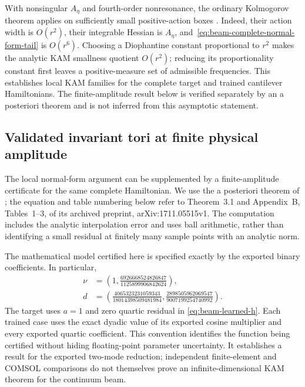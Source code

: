 With nonsingular $A_\eta$ and fourth-order nonresonance, the ordinary
Kolmogorov theorem applies on sufficiently small positive-action boxes
\citep[Theorems~A--B, arXiv:0908.2234v1]{poschel}.
Indeed, their action width is $O(r^2)$, their integrable Hessian is
$A_\eta$, and~\eqref{eq:beam-complete-normal-form-tail} is $O(r^6)$.
Choosing a Diophantine constant proportional to $r^2$ makes the analytic
KAM smallness quotient $O(r^2)$; reducing its proportionality constant
first leaves a positive-measure set of admissible frequencies.
This establishes local KAM families for the complete target and trained
cantilever Hamiltonians. The finite-amplitude result below is verified
separately by an a posteriori theorem and is not inferred from this
asymptotic statement.

\subsection{Validated invariant tori at finite physical amplitude}
\label{sec:unified-aposteriori}

The local normal-form argument can be supplemented by a finite-amplitude
certificate for the same complete Hamiltonian. We use the a posteriori
theorem of \citet{haro2019aposteriori}; the equation and table numbering
below refer to Theorem~3.1 and Appendix~B, Tables~1--3, of its archived
preprint, arXiv:1711.05515v1. The computation includes the analytic
interpolation error and uses ball arithmetic, rather than identifying a
small residual at finitely many sample points with an analytic norm.

The mathematical model certified here is specified exactly by the exported
binary coefficients. In particular,
\begin{equation}
 \begin{aligned}
 \nu&=\left(1,\frac{6926668524826847}{1125899906842624}\right),\\
 d&=\left(\frac{4065323231059343}{18014398509481984},
          \frac{2898505962069547}{9007199254740992}\right).
 \end{aligned}
 \label{eq:certified-beam-parameters}
\end{equation}
The target uses $a=1$ and zero quartic residual in
\eqref{eq:beam-learned-h}. Each trained case uses the exact dyadic value
of its exported cosine multiplier and every exported quartic coefficient.
This convention identifies the function being certified without hiding
floating-point parameter uncertainty. It establishes a result for the
exported two-mode reduction; independent finite-element and COMSOL
comparisons do not themselves prove an infinite-dimensional KAM theorem
for the continuum beam.

